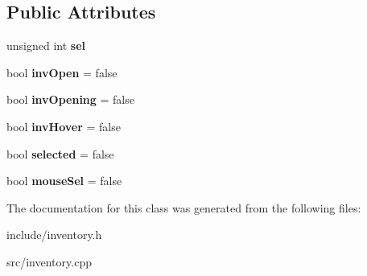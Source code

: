 \subsection*{Public Attributes}
\begin{DoxyCompactItemize}
\item 
\hypertarget{classInventory_a5d722c28f93a03629a9f89574b19439c}{}unsigned int {\bfseries sel}\label{classInventory_a5d722c28f93a03629a9f89574b19439c}

\item 
\hypertarget{classInventory_a553173903f401bb9c2266e835eee22c2}{}bool {\bfseries inv\+Open} = false\label{classInventory_a553173903f401bb9c2266e835eee22c2}

\item 
\hypertarget{classInventory_a9421553e33c39f45c0785e6cb3b2cfb6}{}bool {\bfseries inv\+Opening} = false\label{classInventory_a9421553e33c39f45c0785e6cb3b2cfb6}

\item 
\hypertarget{classInventory_a4e403f168bd7356fa4d5ee282bad9443}{}bool {\bfseries inv\+Hover} = false\label{classInventory_a4e403f168bd7356fa4d5ee282bad9443}

\item 
\hypertarget{classInventory_ad6d93c6b6f621f8fe03fbbd1f63863d4}{}bool {\bfseries selected} = false\label{classInventory_ad6d93c6b6f621f8fe03fbbd1f63863d4}

\item 
\hypertarget{classInventory_a263a170660c9a0f9de4a7a13f71a4c6a}{}bool {\bfseries mouse\+Sel} = false\label{classInventory_a263a170660c9a0f9de4a7a13f71a4c6a}

\end{DoxyCompactItemize}


The documentation for this class was generated from the following files\+:\begin{DoxyCompactItemize}
\item 
include/inventory.\+h\item 
src/inventory.\+cpp\end{DoxyCompactItemize}
